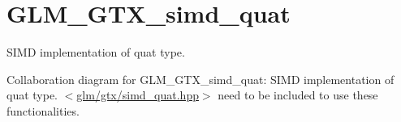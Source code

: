 \hypertarget{group__gtx__simd__quat}{\section{G\-L\-M\-\_\-\-G\-T\-X\-\_\-simd\-\_\-quat}
\label{group__gtx__simd__quat}
}


S\-I\-M\-D implementation of quat type.  


Collaboration diagram for G\-L\-M\-\_\-\-G\-T\-X\-\_\-simd\-\_\-quat\-:
S\-I\-M\-D implementation of quat type. $<$\hyperlink{simd__quat_8hpp}{glm/gtx/simd\-\_\-quat.\-hpp}$>$ need to be included to use these functionalities. 